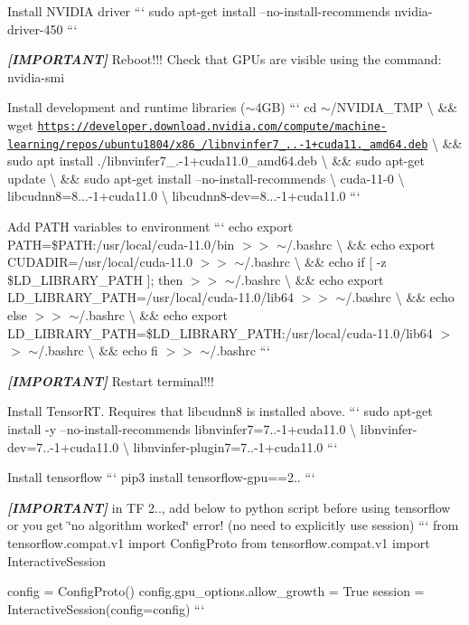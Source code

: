 \begin{DoxyItemize}
\item Install N\+V\+I\+D\+IA driver ``` sudo apt-\/get install --no-\/install-\/recommends nvidia-\/driver-\/450 ```
\item {\itshape {\bfseries \mbox{[}I\+M\+P\+O\+R\+T\+A\+NT\mbox{]}}} Reboot!!! Check that G\+P\+Us are visible using the command\+: nvidia-\/smi
\item Install development and runtime libraries ($\sim$4\+GB) ``` cd $\sim$/\+N\+V\+I\+D\+I\+A\+\_\+\+T\+MP \textbackslash{} \&\& wget \href{https://developer.download.nvidia.com/compute/machine-learning/repos/ubuntu1804/x86_64/libnvinfer7_7.1.3-1+cuda11.0_amd64.deb}{\tt https\+://developer.\+download.\+nvidia.\+com/compute/machine-\/learning/repos/ubuntu1804/x86\+\_/libnvinfer7\+\_..-\/1+cuda11.\+\_\+amd64.\+deb} \textbackslash{} \&\& sudo apt install ./libnvinfer7\+\_.-\/1+cuda11.0\+\_\+amd64.\+deb \textbackslash{} \&\& sudo apt-\/get update \textbackslash{} \&\& sudo apt-\/get install --no-\/install-\/recommends \textbackslash{} cuda-\/11-\/0 \textbackslash{} libcudnn8=8...-\/1+cuda11.0 \textbackslash{} libcudnn8-\/dev=8...-\/1+cuda11.0 ```
\item Add P\+A\+TH variables to environment ``` echo \textquotesingle{}export P\+A\+TH=\$\+P\+A\+TH\+:/usr/local/cuda-\/11.0/bin\textquotesingle{} $>$$>$ $\sim$/.bashrc \textbackslash{} \&\& echo \textquotesingle{}export C\+U\+D\+A\+D\+IR=/usr/local/cuda-\/11.0\textquotesingle{} $>$$>$ $\sim$/.bashrc \textbackslash{} \&\& echo \textquotesingle{}if \mbox{[} -\/z \$\+L\+D\+\_\+\+L\+I\+B\+R\+A\+R\+Y\+\_\+\+P\+A\+TH \mbox{]}; then\textquotesingle{} $>$$>$ $\sim$/.bashrc \textbackslash{} \&\& echo \textquotesingle{} export L\+D\+\_\+\+L\+I\+B\+R\+A\+R\+Y\+\_\+\+P\+A\+TH=/usr/local/cuda-\/11.0/lib64\textquotesingle{} $>$$>$ $\sim$/.bashrc \textbackslash{} \&\& echo \textquotesingle{}else\textquotesingle{} $>$$>$ $\sim$/.bashrc \textbackslash{} \&\& echo \textquotesingle{} export L\+D\+\_\+\+L\+I\+B\+R\+A\+R\+Y\+\_\+\+P\+A\+TH=\$\+L\+D\+\_\+\+L\+I\+B\+R\+A\+R\+Y\+\_\+\+P\+A\+TH\+:/usr/local/cuda-\/11.0/lib64\textquotesingle{} $>$$>$ $\sim$/.bashrc \textbackslash{} \&\& echo \textquotesingle{}fi\textquotesingle{} $>$$>$ $\sim$/.bashrc ```
\item {\itshape {\bfseries \mbox{[}I\+M\+P\+O\+R\+T\+A\+NT\mbox{]}}} Restart terminal!!!
\item Install Tensor\+RT. Requires that libcudnn8 is installed above. ``` sudo apt-\/get install -\/y --no-\/install-\/recommends libnvinfer7=7..-\/1+cuda11.0 \textbackslash{} libnvinfer-\/dev=7..-\/1+cuda11.0 \textbackslash{} libnvinfer-\/plugin7=7..-\/1+cuda11.0 ```
\item Install tensorflow ``` pip3 install tensorflow-\/gpu==2.. ```
\item {\itshape {\bfseries \mbox{[}I\+M\+P\+O\+R\+T\+A\+NT\mbox{]}}} in TF 2.., add below to python script before using tensorflow or you get \char`\"{}no algorithm worked\char`\"{} error! (no need to explicitly use session) ``` from tensorflow.\+compat.\+v1 import Config\+Proto from tensorflow.\+compat.\+v1 import Interactive\+Session

config = Config\+Proto() config.\+gpu\+\_\+options.\+allow\+\_\+growth = True session = Interactive\+Session(config=config) ``` 
\end{DoxyItemize}